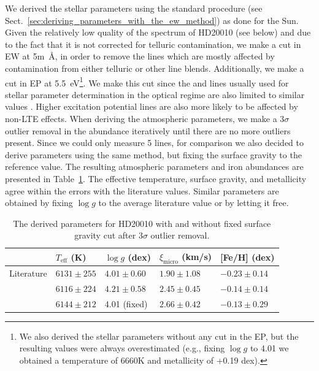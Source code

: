 \documentclass{aa}
\begin{document}
We derived the stellar parameters using the standard procedure (see
Sect.~\ref{sec:deriving_parameters_with_the_ew_method}) as done for
the Sun. Given the relatively low quality of the spectrum of HD20010
(see below) and due to the fact that it is not corrected for telluric
contamination, we make a cut in EW at 5\si{m\angstrom}, in order to
remove the lines which are mostly affected by contamination from either
telluric or other line blends. Additionally, we make a cut in EP at
\SI{5.5}{eV}\footnote{We also derived the stellar parameters without
any cut in the EP, but the resulting values were always overestimated
(e.g., fixing $\log g$ to 4.01 we obtained a temperature of 6660K and
metallicity of +0.19 dex).}. We make this cut since the  and
 lines usually used for stellar parameter determination
in the optical regime are also limited to similar values \citep[see
e.g.][]{Sousa2008a}. Higher excitation potential lines are also more
likely to be affected by non-LTE effects. When deriving the atmospheric
parameters, we make a $3\sigma$ outlier removal in the abundance
iteratively until there are no more outliers present. Since we could
only measure 5  lines, for comparison we also decided to
derive parameters using the same method, but fixing the surface gravity
to the reference value. The resulting atmospheric parameters
and iron abundances are presented in Table~\ref{tab:hd20010}. The
effective temperature, surface gravity, and metallicity agree within the
errors with the literature values. Similar parameters are obtained by
fixing $\log g$ to the average literature value or by letting it free.

\begin{table}[htb!]
    \caption{The derived parameters for HD20010 with and without
    fixed surface gravity cut after 3$\sigma$ outlier removal.}
    \label{tab:hd20010}
    \centering
    \begin{tabular}{lllll}
      \hline\hline
                     & $T_\mathrm{eff}$ (K) &  $\log g$ (dex)  &   $\xi_\mathrm{micro}$ (km/s)  & [Fe/H] (dex)      \\
      \hline
        Literature   & $6131 \pm 255$       &  $4.01 \pm 0.60$ &    $1.90 \pm 1.08$              & $-0.23 \pm 0.14$ \\
      \hline
                     & $6116 \pm 224$       &  $4.21 \pm 0.58$ &    $2.45 \pm 0.45$              & $-0.14 \pm 0.14$ \\
                     & $6144 \pm 212$       &   4.01 (fixed)   &    $2.66 \pm 0.42$              & $-0.13 \pm 0.29$ \\
      \hline
    \end{tabular}
\end{table}
\end{document}
